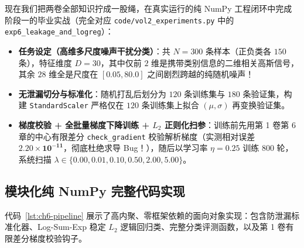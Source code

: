 现在我们把两卷全部知识拧成一股绳，在真实运行的纯 NumPy 工程闭环中完成阶段一的毕业实战（完全对应 \texttt{code/vol2\_experiments.py} 中的 \texttt{exp6\_leakage\_and\_logreg}）：
\begin{itemize}
  \item \textbf{任务设定（高维多尺度噪声干扰分类）}：共 $N=300$ 条样本（正负类各 $150$ 条），特征维度 $D=30$，其中仅前 $2$ 维是携带类别信息的二维相关高斯信号，其余 $28$ 维全是尺度在 $[0.05, 80.0]$ 之间剧烈跨越的纯随机噪声！
  \item \textbf{无泄漏切分与标准化}：随机打乱后划分为 $120$ 条训练集与 $180$ 条验证集，构建 \texttt{StandardScaler} 严格仅在 $120$ 条训练集上拟合 $(\mu, \sigma)$ 再变换验证集。
  \item \textbf{梯度校验 + 全批量梯度下降训练 + $L_2$ 正则化扫参}：训练前先用第 1 卷第 6 章的中心有限差分 \texttt{check\_gradient} 校验解析梯度（实测相对误差 $\mathbf{2.20 \times 10^{-11}}$，彻底杜绝求导 Bug！），随后以学习率 $\eta = 0.25$ 训练 $800$ 轮，系统扫描 $\lambda \in \{0.00, 0.01, 0.10, 0.50, 2.00, 5.00\}$。
\end{itemize}

\subsection{模块化纯 NumPy 完整代码实现}
\label{subsec:ch6-code}

代码~\ref{lst:ch6-pipeline} 展示了高内聚、零框架依赖的面向对象实现：包含防泄漏标准化器、Log-Sum-Exp 稳定 $L_2$ 逻辑回归类、完整分类评测函数，以及第 1 卷有限差分梯度校验钩子。

